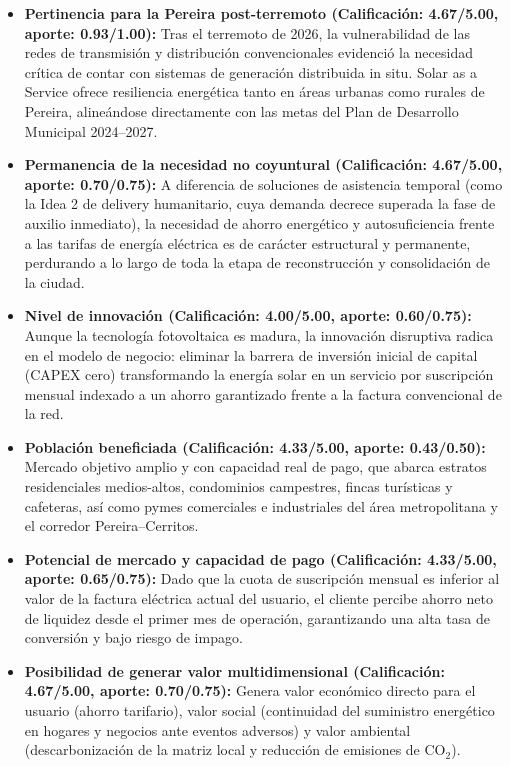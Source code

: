 \documentclass[11pt,a4paper]{article}
\begin{document}
\begin{itemize}[leftmargin=1.6em, label={\small\color{colorEco}}]
    \item \textbf{Pertinencia para la Pereira post-terremoto (Calificación: 4.67/5.00, aporte: 0.93/1.00):} Tras el terremoto de 2026, la vulnerabilidad de las redes de transmisión y distribución convencionales evidenció la necesidad crítica de contar con sistemas de generación distribuida in situ. Solar as a Service ofrece resiliencia energética tanto en áreas urbanas como rurales de Pereira, alineándose directamente con las metas del Plan de Desarrollo Municipal 2024--2027.
    
    \item \textbf{Permanencia de la necesidad no coyuntural (Calificación: 4.67/5.00, aporte: 0.70/0.75):} A diferencia de soluciones de asistencia temporal (como la Idea 2 de delivery humanitario, cuya demanda decrece superada la fase de auxilio inmediato), la necesidad de ahorro energético y autosuficiencia frente a las tarifas de energía eléctrica es de carácter estructural y permanente, perdurando a lo largo de toda la etapa de reconstrucción y consolidación de la ciudad.
    
    \item \textbf{Nivel de innovación (Calificación: 4.00/5.00, aporte: 0.60/0.75):} Aunque la tecnología fotovoltaica es madura, la innovación disruptiva radica en el modelo de negocio: eliminar la barrera de inversión inicial de capital (CAPEX cero) transformando la energía solar en un servicio por suscripción mensual indexado a un ahorro garantizado frente a la factura convencional de la red.
    
    \item \textbf{Población beneficiada (Calificación: 4.33/5.00, aporte: 0.43/0.50):} Mercado objetivo amplio y con capacidad real de pago, que abarca estratos residenciales medios-altos, condominios campestres, fincas turísticas y cafeteras, así como pymes comerciales e industriales del área metropolitana y el corredor Pereira--Cerritos.
    
    \item \textbf{Potencial de mercado y capacidad de pago (Calificación: 4.33/5.00, aporte: 0.65/0.75):} Dado que la cuota de suscripción mensual es inferior al valor de la factura eléctrica actual del usuario, el cliente percibe ahorro neto de liquidez desde el primer mes de operación, garantizando una alta tasa de conversión y bajo riesgo de impago.
    
    \item \textbf{Posibilidad de generar valor multidimensional (Calificación: 4.67/5.00, aporte: 0.70/0.75):} Genera valor económico directo para el usuario (ahorro tarifario), valor social (continuidad del suministro energético en hogares y negocios ante eventos adversos) y valor ambiental (descarbonización de la matriz local y reducción de emisiones de CO$_2$).
    

\end{itemize}
\end{document}
